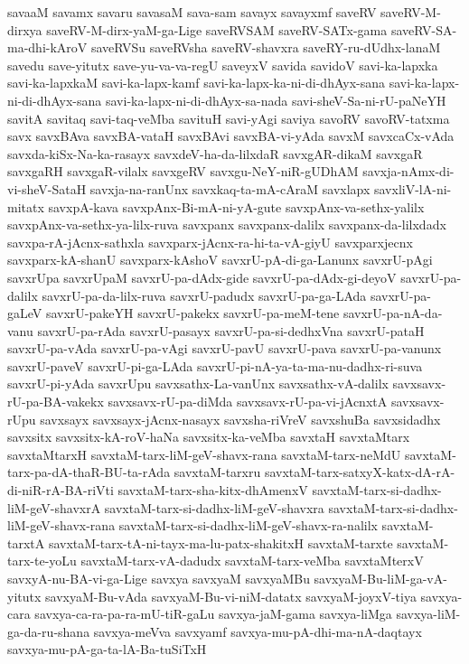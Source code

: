 {savaaM
savamx
savaru
savasaM
sava-sam
savayx
savayxmf
saveRV
saveRV-M-dirxya
saveRV-M-dirx-yaM-ga-Lige
saveRVSAM
saveRV-SATx-gama
saveRV-SA-ma-dhi-kAroV
saveRVSu
saveRVsha
saveRV-shavxra
saveRY-ru-dUdhx-lanaM
savedu
save-yitutx
save-yu-va-va-regU
saveyxV
savida
savidoV
savi-ka-lapxka
savi-ka-lapxkaM
savi-ka-lapx-kamf
savi-ka-lapx-ka-ni-di-dhAyx-sana
savi-ka-lapx-ni-di-dhAyx-sana
savi-ka-lapx-ni-di-dhAyx-sa-nada
savi-sheV-Sa-ni-rU-paNeYH
savitA
savitaq
savi-taq-veMba
savituH
savi-yAgi
saviya
savoRV
savoRV-tatxma
savx
savxBAva
savxBA-vataH
savxBAvi
savxBA-vi-yAda
savxM
savxcaCx-vAda
savxda-kiSx-Na-ka-rasayx
savxdeV-ha-da-lilxdaR
savxgAR-dikaM
savxgaR
savxgaRH
savxgaR-vilalx
savxgeRV
savxgu-NeY-niR-gUDhAM
savxja-nAmx-di-vi-sheV-SataH
savxja-na-ranUnx
savxkaq-ta-mA-cAraM
savxlapx
savxliV-lA-ni-mitatx
savxpA-kava
savxpAnx-Bi-mA-ni-yA-gute
savxpAnx-va-sethx-yalilx
savxpAnx-va-sethx-ya-lilx-ruva
savxpanx
savxpanx-dalilx
savxpanx-da-lilxdadx
savxpa-rA-jAcnx-sathxla
savxparx-jAcnx-ra-hi-ta-vA-giyU
savxparxjecnx
savxparx-kA-shanU
savxparx-kAshoV
savxrU-pA-di-ga-Lanunx
savxrU-pAgi
savxrUpa
savxrUpaM
savxrU-pa-dAdx-gide
savxrU-pa-dAdx-gi-deyoV
savxrU-pa-dalilx
savxrU-pa-da-lilx-ruva
savxrU-padudx
savxrU-pa-ga-LAda
savxrU-pa-gaLeV
savxrU-pakeYH
savxrU-pakekx
savxrU-pa-meM-tene
savxrU-pa-nA-da-vanu
savxrU-pa-rAda
savxrU-pasayx
savxrU-pa-si-dedhxVna
savxrU-pataH
savxrU-pa-vAda
savxrU-pa-vAgi
savxrU-pavU
savxrU-pava
savxrU-pa-vanunx
savxrU-paveV
savxrU-pi-ga-LAda
savxrU-pi-nA-ya-ta-ma-nu-dadhx-ri-suva
savxrU-pi-yAda
savxrUpu
savxsathx-La-vanUnx
savxsathx-vA-dalilx
savxsavx-rU-pa-BA-vakekx
savxsavx-rU-pa-diMda
savxsavx-rU-pa-vi-jAcnxtA
savxsavx-rUpu
savxsayx
savxsayx-jAcnx-nasayx
savxsha-riVreV
savxshuBa
savxsidadhx
savxsitx
savxsitx-kA-roV-haNa
savxsitx-ka-veMba
savxtaH
savxtaMtarx
savxtaMtarxH
savxtaM-tarx-liM-geV-shavx-rana
savxtaM-tarx-neMdU
savxtaM-tarx-pa-dA-thaR-BU-ta-rAda
savxtaM-tarxru
savxtaM-tarx-satxyX-katx-dA-rA-di-niR-rA-BA-riVti
savxtaM-tarx-sha-kitx-dhAmenxV
savxtaM-tarx-si-dadhx-liM-geV-shavxrA
savxtaM-tarx-si-dadhx-liM-geV-shavxra
savxtaM-tarx-si-dadhx-liM-geV-shavx-rana
savxtaM-tarx-si-dadhx-liM-geV-shavx-ra-nalilx
savxtaM-tarxtA
savxtaM-tarx-tA-ni-tayx-ma-lu-patx-shakitxH
savxtaM-tarxte
savxtaM-tarx-te-yoLu
savxtaM-tarx-vA-dadudx
savxtaM-tarx-veMba
savxtaMterxV
savxyA-nu-BA-vi-ga-Lige
savxya
savxyaM
savxyaMBu
savxyaM-Bu-liM-ga-vA-yitutx
savxyaM-Bu-vAda
savxyaM-Bu-vi-niM-datatx
savxyaM-joyxV-tiya
savxya-cara
savxya-ca-ra-pa-ra-mU-tiR-gaLu
savxya-jaM-gama
savxya-liMga
savxya-liM-ga-da-ru-shana
savxya-meVva
savxyamf
savxya-mu-pA-dhi-ma-nA-daqtayx
savxya-mu-pA-ga-ta-lA-Ba-tuSiTxH
}
